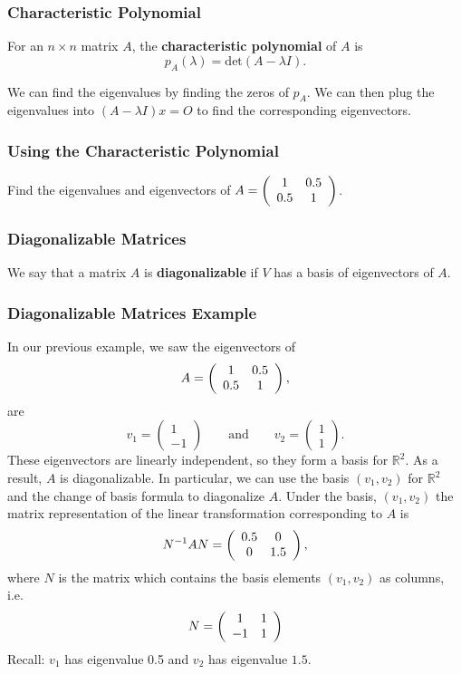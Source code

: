 \documentclass{beamer}
\begin{document}
\begin{frame}

\begin{Definition}
\frametitle{Characteristic Polynomial}
For an $n\times n$ matrix $A$, the {\bf characteristic polynomial} of $A$ is
$$
p_A(\lambda) = \text{det}(A - \lambda I).
$$
\end{Definition}
We can find the eigenvalues by finding the zeros of $p_A$. We can then plug the eigenvalues into $(A - \lambda I)x = O$ to find the corresponding eigenvectors.
\end{frame}

\begin{frame}[t]
\frametitle{Using the Characteristic Polynomial}
\begin{Example}
Find the eigenvalues and eigenvectors of $A = \left(\begin{array}{c c} 1	&	0.5\\ 0.5	&	1\end{array}\right)$.
\end{Example}

\end{frame}

\begin{frame}
\frametitle{Diagonalizable Matrices}
\begin{Definition}
We say that a matrix $A$ is {\bf diagonalizable} if $V$ has a basis of eigenvectors of $A$.
\end{Definition}
\end{frame}

\begin{frame}
\frametitle{Diagonalizable Matrices Example}
{
\tiny
In our previous example, we saw the eigenvectors of 
$$
A = \left(\begin{array}{c c} 1	&	0.5\\	0.5	&	1\end{array}\right),
$$
are
$$
v_1 = \left(\begin{array}{c} 1\\	-1\end{array}\right)\qquad\text{and}\qquad v_2 = \left(\begin{array}{c} 1\\ 1\end{array}\right).
$$  
These eigenvectors are linearly independent, so they form a basis for $\mathbb{R}^2$. As a result, $A$ is diagonalizable. In particular, we can use the basis $(v_1, v_2)$ for $\mathbb{R}^2$ and the change of basis formula to diagonalize $A$. Under the basis, $(v_1, v_2)$ the matrix representation of the linear transformation corresponding to $A$ is
$$
N^{-1}  A N= \left(\begin{array}{c c} 0.5	&	0\\	0	&	1.5\end{array}\right),
$$
where $N$ is the matrix which contains the basis elements $(v_1, v_2)$ as columns, i.e.
$$
N =  \left(\begin{array}{c c} 1	&	1\\ -1 & 1\end{array}\right) 
$$
Recall: $v_1$ has eigenvalue 0.5 and $v_2$ has eigenvalue $1.5$.
}
\end{frame}
\end{document}
